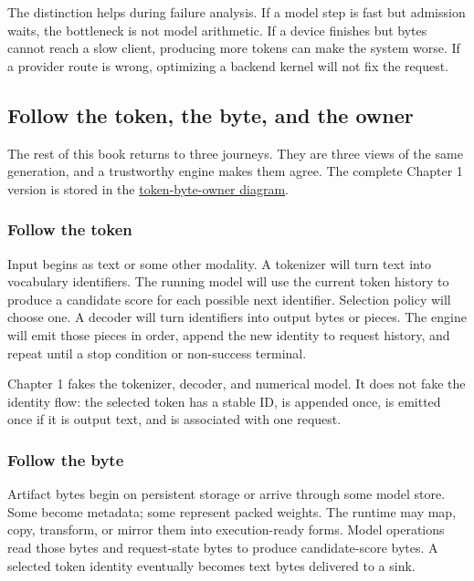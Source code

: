 \documentclass[
  10pt,
]{article}
\begin{document}
The distinction helps during failure analysis. If a model step is fast
but admission waits, the bottleneck is not model arithmetic. If a device
finishes but bytes cannot reach a slow client, producing more tokens can
make the system worse. If a provider route is wrong, optimizing a
backend kernel will not fix the request.

\subsection{Follow the token, the byte, and the
owner}\label{follow-the-token-the-byte-and-the-owner}

The rest of this book returns to three journeys. They are three views of
the same generation, and a trustworthy engine makes them agree. The
complete Chapter 1 version is stored in the
\href{https://github.com/hermonai/inside-the-llm-engine/blob/astra-visual-rewrite/diagrams/runtime/token-byte-owner.txt}{token-byte-owner
diagram}.

\subsubsection{Follow the token}\label{follow-the-token}

Input begins as text or some other modality. A tokenizer will turn text
into vocabulary identifiers. The running model will use the current
token history to produce a candidate score for each possible next
identifier. Selection policy will choose one. A decoder will turn
identifiers into output bytes or pieces. The engine will emit those
pieces in order, append the new identity to request history, and repeat
until a stop condition or non-success terminal.

Chapter 1 fakes the tokenizer, decoder, and numerical model. It does not
fake the identity flow: the selected token has a stable ID, is appended
once, is emitted once if it is output text, and is associated with one
request.

\subsubsection{Follow the byte}\label{follow-the-byte}

Artifact bytes begin on persistent storage or arrive through some model
store. Some become metadata; some represent packed weights. The runtime
may map, copy, transform, or mirror them into execution-ready forms.
Model operations read those bytes and request-state bytes to produce
candidate-score bytes. A selected token identity eventually becomes text
bytes delivered to a sink.
\end{document}
